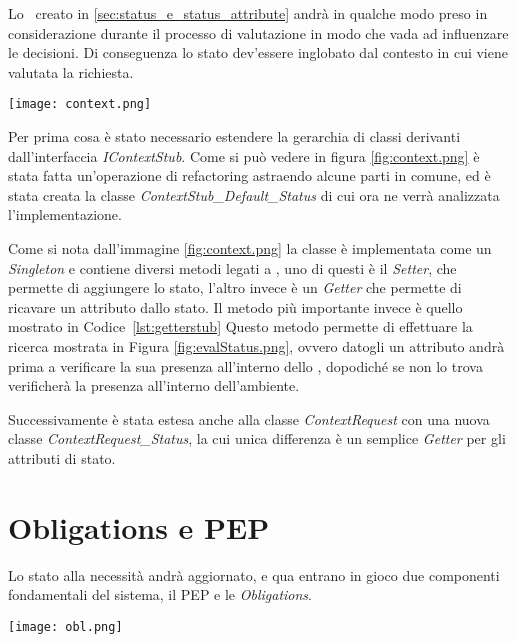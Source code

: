Lo \status \ creato in \ref{sec:status_e_status_attribute} andrà in qualche modo preso in considerazione durante il processo di valutazione in modo che vada ad influenzare le decisioni.
Di conseguenza lo stato dev'essere inglobato dal contesto in cui viene valutata la richiesta.
\begin{sidewaysfigure}
    \centering
	\texttt{[image: context.png]}
    \caption{Grafico UML del contesto}
    \label{fig:context.png}
\end{sidewaysfigure}

Per prima cosa è stato necessario estendere la gerarchia di classi derivanti dall'interfaccia \textit{IContextStub}. Come si può vedere in figura \ref{fig:context.png} è stata fatta un'operazione di refactoring astraendo alcune parti in comune, ed è stata creata la classe \textit{ContextStub\_Default\_Status} di cui ora ne verrà analizzata l'implementazione.\\ \par
Come si nota dall'immagine \ref{fig:context.png} la classe è implementata come un \textit{Singleton} e contiene diversi metodi legati a \status, uno di questi è il \textit{Setter}, che permette di aggiungere lo stato, l'altro invece è un \textit{Getter} che permette di ricavare un attributo dallo stato.
Il metodo più importante invece è quello mostrato in Codice~\ref{lst:getterstub}
Questo metodo permette di effettuare la ricerca mostrata in Figura \ref{fig:evalStatus.png}, ovvero datogli un attributo andrà prima a verificare la sua presenza all'interno dello \status, dopodiché se non lo trova verificherà la presenza all'interno dell'ambiente.\\ \par
Successivamente è stata estesa anche alla classe \textit{ContextRequest} con una nuova classe \textit{ContextRequest\_Status}, la cui unica differenza è un semplice \textit{Getter} per gli attributi di stato.

\section{Obligations e PEP} %
\label{sec:obligations_e_pep}

Lo stato alla necessità andrà aggiornato, e qua entrano in gioco due componenti fondamentali del sistema, il PEP e le \textit{Obligations}. 

\begin{sidewaysfigure}
    \centering
	\texttt{[image: obl.png]}
    \caption{Relazioni tra Obligation e PEP}
    \label{fig:obl.png}
\end{sidewaysfigure}


